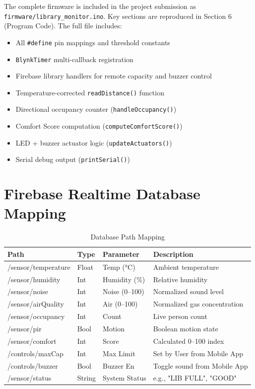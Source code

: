 \documentclass[12pt,a4paper]{article}
\begin{document}
The complete firmware is included in the project submission as \texttt{firmware/library\_monitor.ino}. Key sections are reproduced in Section 6 (Program Code). The full file includes:

\begin{itemize}[leftmargin=1.5cm]
  \item All \texttt{\#define} pin mappings and threshold constants
  \item \texttt{BlynkTimer} multi-callback registration
  \item Firebase library handlers for remote capacity and buzzer control
  \item Temperature-corrected \texttt{readDistance()} function
  \item Directional occupancy counter (\texttt{handleOccupancy()})
  \item Comfort Score computation (\texttt{computeComfortScore()})
  \item LED + buzzer actuator logic (\texttt{updateActuators()})
  \item Serial debug output (\texttt{printSerial()})
\end{itemize}

\section{Firebase Realtime Database Mapping}

\begin{table}[H]
\centering
\caption{Database Path Mapping}
\begin{tabular}{l l l l}
\toprule
\textbf{Path} & \textbf{Type} & \textbf{Parameter} & \textbf{Description} \\
\midrule
/sensor/temperature & Float & Temp (°C) & Ambient temperature \\
/sensor/humidity    & Int   & Humidity (\%) & Relative humidity \\
/sensor/noise       & Int   & Noise (0--100) & Normalized sound level \\
/sensor/airQuality  & Int   & Air (0--100) & Normalized gas concentration \\
/sensor/occupancy   & Int   & Count & Live person count \\
/sensor/pir         & Bool  & Motion & Boolean motion state \\
/sensor/comfort     & Int   & Score & Calculated 0--100 index \\
/controls/maxCap    & Int   & Max Limit & Set by User from Mobile App \\
/controls/buzzer    & Bool  & Buzzer En & Toggle sound from Mobile App \\
/sensor/status      & String & System Status & e.g., "LIB FULL", "GOOD" \\
\bottomrule
\end{tabular}
\end{table}
\end{document}
